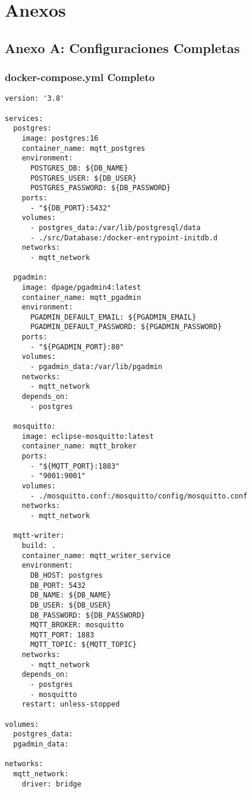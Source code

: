 \chapter{Anexos}

\section{Anexo A: Configuraciones Completas}

\subsection{docker-compose.yml Completo}

\begin{verbatim}
version: '3.8'

services:
  postgres:
    image: postgres:16
    container_name: mqtt_postgres
    environment:
      POSTGRES_DB: ${DB_NAME}
      POSTGRES_USER: ${DB_USER}
      POSTGRES_PASSWORD: ${DB_PASSWORD}
    ports:
      - "${DB_PORT}:5432"
    volumes:
      - postgres_data:/var/lib/postgresql/data
      - ./src/Database:/docker-entrypoint-initdb.d
    networks:
      - mqtt_network

  pgadmin:
    image: dpage/pgadmin4:latest
    container_name: mqtt_pgadmin
    environment:
      PGADMIN_DEFAULT_EMAIL: ${PGADMIN_EMAIL}
      PGADMIN_DEFAULT_PASSWORD: ${PGADMIN_PASSWORD}
    ports:
      - "${PGADMIN_PORT}:80"
    volumes:
      - pgadmin_data:/var/lib/pgadmin
    networks:
      - mqtt_network
    depends_on:
      - postgres

  mosquitto:
    image: eclipse-mosquitto:latest
    container_name: mqtt_broker
    ports:
      - "${MQTT_PORT}:1883"
      - "9001:9001"
    volumes:
      - ./mosquitto.conf:/mosquitto/config/mosquitto.conf
    networks:
      - mqtt_network

  mqtt-writer:
    build: .
    container_name: mqtt_writer_service
    environment:
      DB_HOST: postgres
      DB_PORT: 5432
      DB_NAME: ${DB_NAME}
      DB_USER: ${DB_USER}
      DB_PASSWORD: ${DB_PASSWORD}
      MQTT_BROKER: mosquitto
      MQTT_PORT: 1883
      MQTT_TOPIC: ${MQTT_TOPIC}
    networks:
      - mqtt_network
    depends_on:
      - postgres
      - mosquitto
    restart: unless-stopped

volumes:
  postgres_data:
  pgadmin_data:

networks:
  mqtt_network:
    driver: bridge
\end{verbatim}

